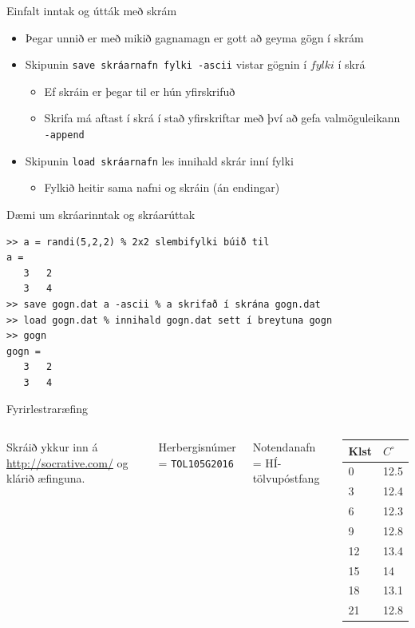 \documentclass{beamer}
\begin{document}
\begin{frame}{Einfalt inntak og útták með skrám}
\begin{itemize}
 \item Þegar unnið er með mikið gagnamagn er gott að geyma gögn í skrám
 \item Skipunin \texttt{save skráarnafn fylki -ascii} vistar gögnin í $fylki$ í skrá
 \begin{itemize}
  \item Ef skráin er þegar til er hún yfirskrifuð
  \item Skrifa má aftast í skrá í stað yfirskriftar með því að gefa valmöguleikann \texttt{-append}
 \end{itemize}
 \item Skipunin \texttt{load skráarnafn} les innihald skrár inní fylki
  \begin{itemize}
   \item Fylkið heitir sama nafni og skráin (án endingar)
  \end{itemize}
 \end{itemize}
\end{frame}

\begin{frame}[fragile]{Dæmi um skráarinntak og skráarúttak}
\begin{verbatim}
>> a = randi(5,2,2) % 2x2 slembifylki búið til
a =
   3   2
   3   4
>> save gogn.dat a -ascii % a skrifað í skrána gogn.dat
>> load gogn.dat % innihald gogn.dat sett í breytuna gogn
>> gogn
gogn =
   3   2
   3   4
\end{verbatim}
\end{frame}

\begin{frame}{Fyrirlestraræfing}
\begin{columns}
Skráið ykkur inn á \url{http://socrative.com/} og klárið æfinguna.

Herbergisnúmer = \texttt{TOL105G2016}

Notendanafn = HÍ-tölvupóstfang
\begin{center}
\begin{tabular}{ll}
\toprule
Klst&$C^\circ$\\
\midrule
0&12.5\\
3&12.4\\
6&12.3\\
9&12.8\\
12&13.4\\
15&14\\
18&13.1\\
21&12.8\\
\bottomrule
\end{tabular}
\end{center}
\end{columns}

\end{frame}
\end{document}
